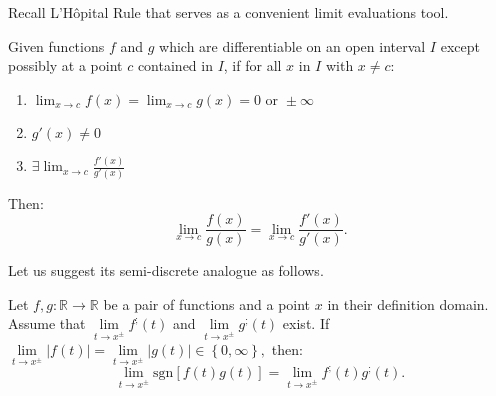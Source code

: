 \documentclass[11pt]{book}
\begin{document}
Recall L'Hôpital Rule that serves as a convenient limit evaluations tool.
\begin{theorem}Given functions $f$ and $g$ which are differentiable on an open interval $I$ except possibly at a point $c$ contained in $I$, if for all $x$ in $I$ with $x \neq c$:
\begin{enumerate}
    \item $\lim _{x\to c}f(x)=\lim _{x\to c}g(x)=0{\text{ or }}\pm \infty$
    \item $g'(x)\neq 0$
    \item $\exists \lim _{x\to c}{\frac {f'(x)}{g'(x)}}$
\end{enumerate}
Then:
$$\lim _{x\to c}{\frac {f(x)}{g(x)}}=\lim _{x\to c}{\frac {f'(x)}{g'(x)}}.$$
\label{lhopital_derivative}
\end{theorem}
Let us suggest its semi-discrete analogue as follows.
\begin{theorem}Let $f,g:\mathbb{R}\rightarrow\mathbb{R}$ be a pair of functions and a point $x$ in their definition domain. Assume that $\underset{t\rightarrow x^{\pm}}{\lim}f^{;}\left(t\right)$ and $\underset{t\rightarrow x^{\pm}}{\lim}g^{;}\left(t\right)$ exist. If $\underset{t\rightarrow x^{\pm}}{\lim}\left|f\left(t\right)\right|=\underset{t\rightarrow x^{\pm}}{\lim}\left|g\left(t\right)\right|\in\left\{ 0,\infty\right\},$ then:
$$\underset{t\rightarrow x^{\pm}}{\lim}\text{sgn}\left[f\left(t\right)g\left(t\right)\right]=\underset{t\rightarrow x^{\pm}}{\lim}f^{;}\left(t\right)g^{;}\left(t\right).$$
\label{lhopital}
\end{theorem}
\end{document}
